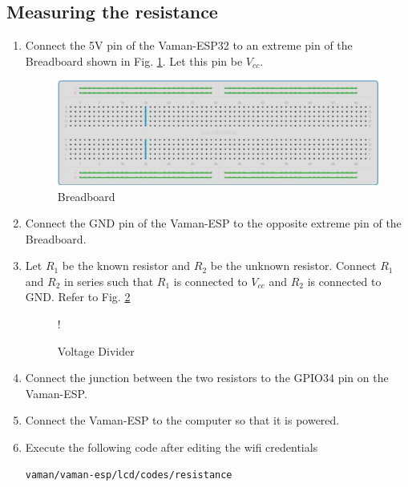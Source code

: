 \subsection{Measuring the resistance}
\begin{enumerate}[label=\thesection.\arabic*.,ref=\thesection.\theenumi]

\item Connect the 5V pin of the Vaman-ESP32 to an extreme pin of the Breadboard 
shown in Fig. \ref{fig:breadboard}. Let this pin be $V_{cc}$.

\begin{figure}[!ht]
\centering
\includegraphics[width=\columnwidth]{vaman-esp32/lcd/figs/breadboard.eps}
\caption{Breadboard}
\label{fig:breadboard}
\end{figure}
%
\item
Connect the GND pin of the Vaman-ESP to the opposite extreme pin of the Breadboard.

%
\item
Let $R_1$ be the known resistor and $R_2$ be the unknown resistor.  Connect $R_1$ and $R_2$ in series such that $R_1$ is connected
to $V_{cc}$ and $R_2$ is connected to GND. Refer to Fig. \ref{fig:voltage_divider}

%
\begin{figure}[!ht]
\centering
\resizebox {\columnwidth} {!} {

}
\caption{Voltage Divider}
\label{fig:voltage_divider}
\end{figure}
%
\item
Connect the junction between the two resistors to  the GPIO34 pin on the Vaman-ESP.

%
\item
Connect the Vaman-ESP to the computer so that it is powered.
\item
Execute the following code after editing the wifi credentials

\begin{lstlisting}
vaman/vaman-esp/lcd/codes/resistance
\end{lstlisting}

\end{enumerate}
